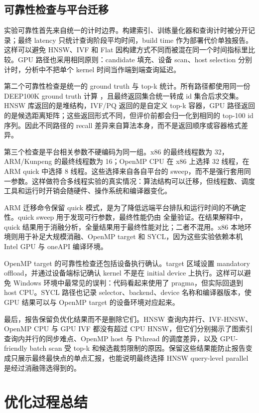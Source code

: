 \documentclass[11pt,a4paper]{article}
\newcommand{\code}[1]{\texttt{\detokenize{#1}}}
\begin{document}
\subsection{可靠性检查与平台迁移}

实验可靠性首先来自统一的计时边界。构建索引、训练量化器和查询计时被分开记录；最终 latency 只统计查询阶段平均时间，build time 作为部署代价单独报告。这样可以避免 HNSW、IVF 和 Flat 因构建方式不同而被混在同一个时间指标里比较。GPU 路径也采用相同原则：candidate 填充、设备 scan、host selection 分别计时，分析中不把单个 kernel 时间当作端到端查询延迟。

第二个可靠性检查是统一的 ground truth 与 top-k 统计。所有路径都使用同一份 DEEP100K ground truth 计算 \code{recall@100}，且最终返回集合统一转成 id 集合后求交集。HNSW 库返回的是堆结构，IVF/PQ 返回的是自定义 top-k 容器，GPU 路径返回的是候选距离矩阵；这些返回形式不同，但评价前都会归一化到相同的 top-100 id 序列。因此不同路径的 recall 差异来自算法本身，而不是返回顺序或容器格式差异。

第三个检查是平台相关参数不硬编码为同一组。x86 的最终线程数为 32，ARM/Kunpeng 的最终线程数为 16；OpenMP CPU 在 x86 上选择 32 线程，在 ARM quick 中选择 8 线程。这些选择来自各自平台的 sweep，而不是强行套用同一参数。这样做符合多线程实验的真实情况：算法结构可以迁移，但线程数、调度工具和运行时开销会随硬件、操作系统和编译器变化。

ARM 迁移命令保留 quick 模式，是为了降低远端平台排队和运行时间的不确定性。quick sweep 用于发现可行参数，最终性能仍由 \code{test.sh} 全量验证。在结果解释中，quick 结果用于消融分析，全量结果用于最终性能对比；二者不混用。x86 本地环境则用于补足大规模消融、OpenMP target 和 SYCL，因为这些实验依赖本机 Intel GPU 与 oneAPI 编译环境。

OpenMP target 的可靠性检查还包括设备执行确认。target 区域设置 mandatory offload，并通过设备端标记确认 kernel 不是在 initial device 上执行。这样可以避免 Windows 环境中最常见的误判：代码看起来使用了 \code{target} pragma，但实际回退到 host CPU。SYCL 路径也记录 selector、backend、device 名称和编译器版本，使 GPU 结果可以与 OpenMP target 的设备环境对应起来。

最后，报告保留负优化结果而不是删除它们。HNSW 查询内并行、IVF-HNSW、OpenMP CPU 与 GPU IVF 都没有超过 CPU HNSW，但它们分别揭示了图索引查询内并行的同步难点、OpenMP host 与 Pthread 的调度差异，以及 GPU-friendly batch scan 受 top-k 和候选裁剪限制的原因。保留这些结果能防止报告变成只展示最终最快点的单点汇报，也能说明最终选择 HNSW query-level parallel 是经过消融筛选得到的。

\section{优化过程总结}
\end{document}
